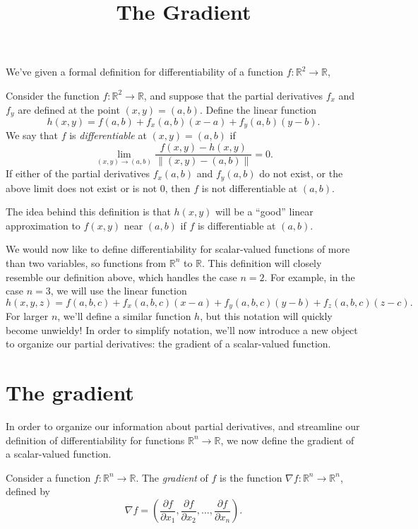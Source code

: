 \documentclass{ximera}
\title{The Gradient}
\begin{document}
\begin{abstract}
\end{abstract}
\maketitle

We've given a formal definition for differentiability of a function $f:\mathbb{R}^2\rightarrow\mathbb{R}$,

\begin{definition}
Consider the function $f:\mathbb{R}^2\rightarrow\mathbb{R}$, and suppose that the partial derivatives $f_x$ and $f_y$ are defined at the point $(x,y)=(a,b)$. Define the linear function
\[
h(x,y) = f(a,b) + f_x(a,b)(x-a)+f_y(a,b)(y-b).
\]
We say that $f$ is \emph{differentiable} at $(x,y) = (a,b)$ if
\[
\lim_{(x,y)\rightarrow (a,b)}\frac{f(x,y) - h(x,y)}{\|(x,y)-(a,b)\|} = 0.
\]
If either of the partial derivatives $f_x(a,b)$ and $f_y(a,b)$ do not exist, or the above limit does not exist or is not $0$, then $f$ is not differentiable at $(a,b)$.
\end{definition}

The idea behind this definition is that $h(x,y)$ will be a ``good'' linear approximation to $f(x,y)$ near $(a,b)$ if $f$ is differentiable at $(a,b)$.

We would now like to define differentiability for scalar-valued functions of more than two variables, so functions from $\mathbb{R}^n$ to $\mathbb{R}$. This definition will closely resemble our definition above, which handles the case $n=2$. For example, in the case $n=3$, we will use the linear function
\[
h(x,y,z) = f(a,b,c) + f_x(a,b,c)(x-a) + f_y(a,b,c)(y-b)+f_z(a,b,c)(z-c).
\]
For larger $n$, we'll define a similar function $h$, but this notation will quickly become unwieldy! In order to simplify notation, we'll now introduce a new object to organize our partial derivatives: the gradient of a scalar-valued function.

\section*{The gradient}

In order to organize our information about partial derivatives, and streamline our definition of differentiability for functions $\mathbb{R}^n\rightarrow\mathbb{R}$, we now define the gradient of a scalar-valued function.

\begin{definition}
Consider a function $f:\mathbb{R}^n\rightarrow\mathbb{R}$. The \emph{gradient} of $f$ is the function $\nabla f:\mathbb{R}^n\rightarrow\mathbb{R}^n$, defined by
\[
\nabla f = \left(\frac{\partial f}{\partial x_1},\frac{\partial f}{\partial x_2},...,\frac{\partial f}{\partial x_n}\right).
\]
\end{definition}
\end{document}
